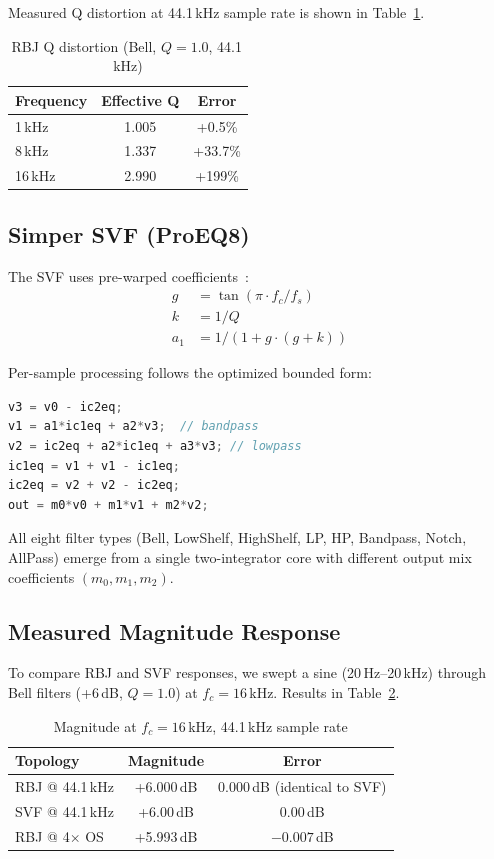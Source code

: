 \documentclass[twocolumn]{article}
\begin{document}
Measured Q distortion at 44.1\,kHz sample rate is shown in Table~\ref{tab:qdistortion}.

\begin{table}[h]
\centering
\caption{RBJ Q distortion (Bell, $Q=1.0$, 44.1\,kHz)}
\label{tab:qdistortion}
\begin{tabular}{lcc}
\toprule
Frequency & Effective Q & Error \\
\midrule
1\,kHz & 1.005 & +0.5\% \\
8\,kHz & 1.337 & +33.7\% \\
16\,kHz & 2.990 & +199\% \\
\bottomrule
\end{tabular}
\end{table}

\subsection{Simper SVF (ProEQ8)}

The SVF uses pre-warped coefficients~\cite{simper}:
\begin{align}
g &= \tan(\pi \cdot f_c / f_s) \\
k &= 1/Q \\
a_1 &= 1 / (1 + g \cdot (g + k))
\end{align}

Per-sample processing follows the optimized bounded form:
\begin{lstlisting}[language=C++]
v3 = v0 - ic2eq;
v1 = a1*ic1eq + a2*v3;  // bandpass
v2 = ic2eq + a2*ic1eq + a3*v3; // lowpass
ic1eq = v1 + v1 - ic1eq;
ic2eq = v2 + v2 - ic2eq;
out = m0*v0 + m1*v1 + m2*v2;
\end{lstlisting}

All eight filter types (Bell, LowShelf, HighShelf, LP, HP, Bandpass, Notch, AllPass) emerge from a single two-integrator core with different output mix coefficients $(m_0, m_1, m_2)$.

\subsection{Measured Magnitude Response}

To compare RBJ and SVF responses, we swept a sine (20\,Hz--20\,kHz) through Bell filters (+6\,dB, $Q=1.0$) at $f_c = 16$\,kHz. Results in Table~\ref{tab:magnitude}.

\begin{table}[h]
\centering
\caption{Magnitude at $f_c = 16$\,kHz, 44.1\,kHz sample rate}
\label{tab:magnitude}
\begin{tabular}{lcc}
\toprule
Topology & Magnitude & Error \\
\midrule
RBJ @ 44.1\,kHz & +6.000\,dB & $0.000$\,dB (identical to SVF) \\
SVF @ 44.1\,kHz & +6.00\,dB & 0.00\,dB \\
RBJ @ 4$\times$ OS & +5.993\,dB & $-0.007$\,dB \\
\bottomrule
\end{tabular}
\end{table}
\end{document}
